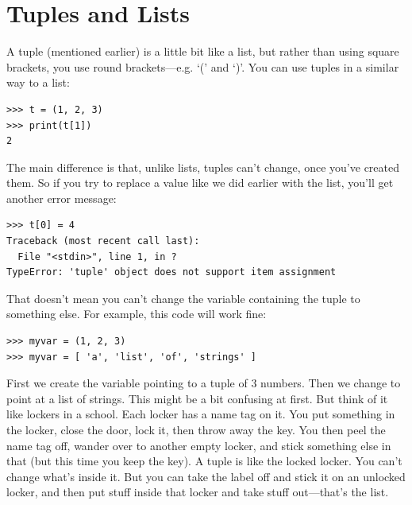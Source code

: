 \section{Tuples and Lists}\label{tuplesandlists}

A tuple (mentioned earlier) is a little bit like a list, but rather than using square brackets, you use round brackets---e.g. `(' and `)'.  You can use tuples in a similar way to a list:

\begin{listing}
\begin{verbatim}
>>> t = (1, 2, 3)
>>> print(t[1])
2
\end{verbatim}
\end{listing}

The main difference is that, unlike lists, tuples can't change, once you've created them.  So if you try to replace a value like we did earlier with the list, you'll get another error message:

\begin{listing}
\begin{verbatim}
>>> t[0] = 4
Traceback (most recent call last):
  File "<stdin>", line 1, in ?
TypeError: 'tuple' object does not support item assignment
\end{verbatim}
\end{listing}

That doesn't mean you can't change the variable containing the tuple to something else.  For example, this code will work fine:

\begin{listing}
\begin{verbatim}
>>> myvar = (1, 2, 3)
>>> myvar = [ 'a', 'list', 'of', 'strings' ]
\end{verbatim}
\end{listing}

First we create the variable  pointing to a tuple of 3 numbers.  Then we change  to point at a list of strings. This might be a bit confusing at first.  But think of it like lockers in a school.  Each locker has a name tag on it. You put something in the locker, close the door, lock it, then throw away the key.  You then peel the name tag off, wander over to another empty locker, and stick something else in that (but this time you keep the key).  A tuple is like the locked locker.  You can't change what's inside it.  But you can take the label off and stick it on an unlocked locker, and then put stuff inside that locker and take stuff out---that's the list.

